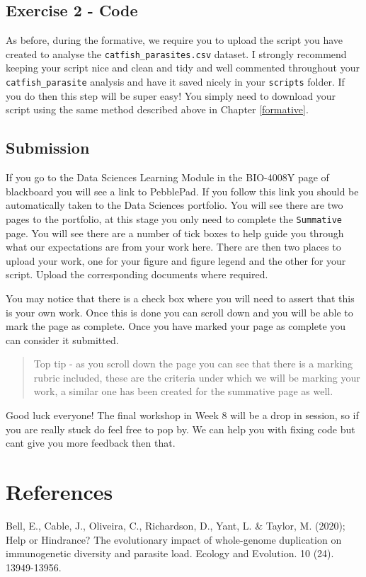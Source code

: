 \documentclass[
]{book}
\begin{document}
\hypertarget{exercise-2---code}{%
\subsection{Exercise 2 - Code}\label{exercise-2---code}}

As before, during the formative, we require you to upload the script you have created to analyse the \texttt{catfish\_parasites.csv} dataset. I strongly recommend keeping your script nice and clean and tidy and well commented throughout your \texttt{catfish\_parasite} analysis and have it saved nicely in your \texttt{scripts} folder. If you do then this step will be super easy! You simply need to download your script using the same method described above in Chapter \ref{formative}.

\hypertarget{submission}{%
\subsection{Submission}\label{submission}}

If you go to the Data Sciences Learning Module in the BIO-4008Y page of blackboard you will see a link to PebblePad. If you follow this link you should be automatically taken to the Data Sciences portfolio. You will see there are two pages to the portfolio, at this stage you only need to complete the \texttt{Summative} page. You will see there are a number of tick boxes to help guide you through what our expectations are from your work here. There are then two places to upload your work, one for your figure and figure legend and the other for your script. Upload the corresponding documents where required.

You may notice that there is a check box where you will need to assert that this is your own work. Once this is done you can scroll down and you will be able to mark the page as complete. Once you have marked your page as complete you can consider it submitted.

\begin{quote}
Top tip - as you scroll down the page you can see that there is a marking rubric included, these are the criteria under which we will be marking your work, a similar one has been created for the summative page as well.
\end{quote}

Good luck everyone! The final workshop in Week 8 will be a drop in session, so if you are really stuck do feel free to pop by. We can help you with fixing code but cant give you more feedback then that.

\hypertarget{references-11}{%
\section{References}\label{references-11}}

Bell, E., Cable, J., Oliveira, C., Richardson, D., Yant, L. \& Taylor, M. (2020); Help or Hindrance? The evolutionary impact of whole-genome duplication on immunogenetic diversity and parasite load. Ecology and Evolution. 10 (24). 13949-13956.
\end{document}
